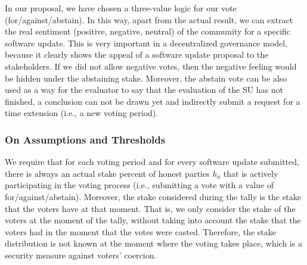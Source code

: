 In our proposal, we have chosen a three-value logic for our vote (for/against/abstain). In this way, apart from the actual result, we can extract the real sentiment (positive, negative, neutral) of the community for a specific software update. This is very important in a decentralized governance model, because it clearly shows the appeal of a software update proposal to the stakeholders. If we did not allow negative votes, then the negative feeling would be hidden under the abstaining stake. 
Moreover, the abstain vote can be also used as a way for the evaluator to say that the evaluation of the SU has not finished, a conclusion can not be drawn yet and indirectly submit a request for a time extension (i.e., a new voting period).

\subsubsection{On Assumptions and Thresholds}
We require that for each voting period and for every software update submitted, there is always an actual stake percent of  honest parties $h_a$ that is actively participating in the voting process (i.e., submitting a vote with a value of for/against/abstain).
Moreover, the stake considered during the tally is the stake that the voters have at that moment. That is, we only consider the stake of the voters at the moment of the tally, without taking into account the stake that the voters had in the moment that the votes were casted. Therefore, the stake distribution is not known at the moment where the voting takes place, which is a security measure against voters' coercion.

